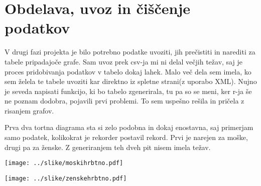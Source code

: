 \documentclass[11pt,a4paper]{article}
\begin{document}
\section{Obdelava, uvoz in čiščenje podatkov}

V drugi fazi projekta je bilo potrebno podatke uvoziti, jih prečistiti in narediti za tabele pripadajoče grafe. Sam uvoz prek csv-ja mi ni delal večjih težav, saj je proces pridobivanja podatkov v tabelo dokaj lahek. Malo več dela sem imela, ko sem želela te tabele uvoziti kar direktno iz spletne strani(z uporabo XML). Nujno je seveda napisati funkcijo, ki bo tabelo zgenerirala, tu pa so se meni, ker r-ja še ne poznam dodobra, pojavili prvi problemi. To sem uspešno rešila in pričela z risanjem grafov. 

Prva dva tortna diagrama sta si zelo podobna in dokaj enostavna, saj primerjam samo podatek, kolikokrat je rekorder postavil rekord. Prvi je narejen za moške, drugi pa za ženske. Z generiranjem teh dveh pit nisem imela težav. 

\texttt{[image: ../slike/moskihrbtno.pdf]}

\texttt{[image: ../slike/zenskehrbtno.pdf]}
\end{document}
